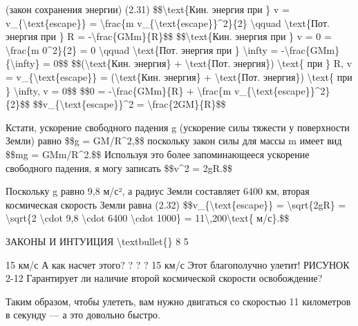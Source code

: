 \documentclass[10pt,oneside]{article}
\begin{document}
(закон сохранения энергии) (2.31) \$\$\textbackslash{}text\{Кин. энергия при \} v = v\_\{\textbackslash{}text\{escape\}\} = \textbackslash{}frac\{m v\_\{\textbackslash{}text\{escape\}\}\textasciicircum{}2\}\{2\} \textbackslash{}qquad \textbackslash{}text\{Пот. энергия при \} R = -\textbackslash{}frac\{GMm\}\{R\}\$\$ \$\$\textbackslash{}text\{Кин. энергия при \} v = 0 = \textbackslash{}frac\{m 0\textasciicircum{}2\}\{2\} = 0 \textbackslash{}qquad \textbackslash{}text\{Пот. энергия при \} \textbackslash{}infty = -\textbackslash{}frac\{GMm\}\{\textbackslash{}infty\} = 0\$\$ \$\$(\textbackslash{}text\{Кин. энергия\} + \textbackslash{}text\{Пот. энергия\}) \textbackslash{}text\{ при \} R, v = v\_\{\textbackslash{}text\{escape\}\} = (\textbackslash{}text\{Кин. энергия\} + \textbackslash{}text\{Пот. энергия\}) \textbackslash{}text\{ при \} \textbackslash{}infty, v = 0\$\$ \$\$0 = -\textbackslash{}frac\{GMm\}\{R\} + \textbackslash{}frac\{m v\_\{\textbackslash{}text\{escape\}\}\textasciicircum{}2\}\{2\}\$\$ \$\$v\_\{\textbackslash{}text\{escape\}\}\textasciicircum{}2 = \textbackslash{}frac\{2GM\}\{R\}\$\$\par

Кстати, ускорение свободного падения g (ускорение силы тяжести у поверхности Земли) равно \$\$g = GM/R\textasciicircum{}2,\$\$ поскольку закон силы для массы m имеет вид \$\$mg = GMm/R\textasciicircum{}2.\$\$ Используя это более запоминающееся ускорение свободного падения, я могу записать \$\$v\textasciicircum{}2 = 2gR.\$\$\par

Поскольку g равно 9,8 м/с², а радиус Земли составляет 6400 км, вторая космическая скорость Земли равна (2.32) \$\$v\_\{\textbackslash{}text\{escape\}\} = \textbackslash{}sqrt\{2gR\} = \textbackslash{}sqrt\{2 \textbackslash{}cdot 9,8 \textbackslash{}cdot 6400 \textbackslash{}cdot 1000\} = 11\textbackslash{},200\textbackslash{}text\{ м/с\}.\$\$\par

ЗАКОНЫ И ИНТУИЦИЯ \textbackslash{}textbullet\{\} 8 5\par

15 км/с А как насчет этого? ? ? ? 15 км/с Этот благополучно улетит! РИСУНОК 2-12 Гарантирует ли наличие второй космической скорости освобождение?\par

Таким образом, чтобы улететь, вам нужно двигаться со скоростью 11 километров в секунду --- а это довольно быстро.\par
\end{document}
